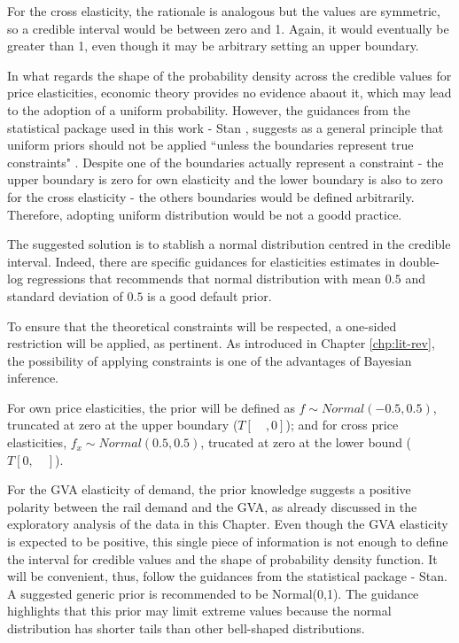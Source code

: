 For the cross elasticity, the rationale is analogous but the values are symmetric, so a credible interval would be between zero and 1. Again, it would eventually be greater than 1, even though it may be arbitrary setting an upper boundary. 


In what regards the shape of the probability density across the credible values for price elasticities, economic theory provides no evidence abaout it, which may lead to the adoption of a uniform probability. However, the guidances from the statistical package used in this work - Stan \citep{stan}, suggests as a general principle that uniform priors should not be applied ``unless the boundaries represent true constraints" \citep{stan_prior}. Despite one of the boundaries actually represent a constraint - the upper boundary is zero for own elasticity and the lower boundary is also to zero for the cross elasticity - the others boundaries would be defined arbitrarily. Therefore, adopting uniform distribution would be not a goodd practice. 

The suggested solution is to stablish a normal distribution centred in the credible interval. Indeed, there are specific guidances for elasticities estimates in double-log regressions that recommends that normal distribution with mean $0.5$ and standard deviation of $0.5$ is a good default prior.

To ensure that the theoretical constraints will be respected, a one-sided restriction will be applied, as pertinent. As introduced in Chapter \ref{chp:lit-rev}, the possibility of applying constraints is one of the advantages of Bayesian inference. 

For own price elasticities, the prior will be defined as $f \sim Normal(-0.5, 0.5)$, truncated at zero at the upper boundary ($T[ \quad , 0]$); and for cross price elasticities, $f_x \sim Normal(0.5, 0.5)$, trucated at zero at the lower bound ($T[0, \quad]$).

For the GVA elasticity of demand, the prior knowledge suggests a positive polarity between the rail demand and the GVA, as already discussed in the exploratory analysis of the data in this Chapter. Even though the GVA elasticity is expected to be positive, this single piece of information is not enough to define the interval for credible values and the shape of probability density function. It will be convenient, thus, follow the guidances from the statistical package - Stan. A suggested generic prior is recommended to be Normal(0,1). The guidance highlights that this prior may limit extreme values because the normal distribution has shorter tails than other bell-shaped distributions. 

